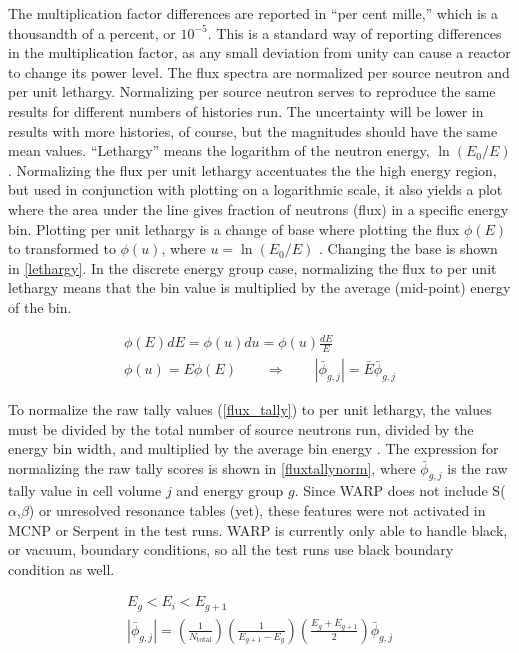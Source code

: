 The multiplication factor differences are reported in ``per cent mille,'' which is a thousandth of a percent, or $10^{-5}$.  This is a standard way of reporting differences in the multiplication factor, as any small deviation from unity can cause a reactor to change its power level.  The flux spectra are normalized per source neutron and per unit lethargy.  Normalizing per source neutron serves to reproduce the same results for different numbers of histories run.  The uncertainty will be lower in results with more histories, of course, but the magnitudes should have the same mean values.   ``Lethargy'' means the logarithm of the neutron energy, $\ln(E_0/E)$ \cite{duderstadt}.  Normalizing the flux per unit lethargy accentuates the the high energy region, but used in conjunction with plotting on a logarithmic scale, it also yields a plot where the area under the line gives fraction of neutrons (flux) in a specific energy bin.  Plotting per unit lethargy is a change of base where plotting the flux $\phi(E)$ to transformed to $\phi(u)$, where $u=\ln(E_0/E)$ \cite{lethargyplot}.  Changing the base is shown in \eqref{lethargy}.  In the discrete energy group case, normalizing the flux to per unit lethargy means that the bin value is multiplied by the average (mid-point) energy of the bin.

\begin{equation}
\label{lethargy}
\begin{gathered}
\phi(E) dE = \phi(u) du = \phi(u) \frac{dE}{E}\\
\phi(u) = E \phi(E) \qquad \Rightarrow \qquad  |\bar{\phi}_{g,j}| = \bar{E} \bar{\phi}_{g,j}
\end{gathered}
\end{equation}

To normalize the raw tally values (\eqref{flux_tally}) to per unit lethargy, the values must be divided by the total number of source neutrons run, divided by the energy bin width, and multiplied by the average bin energy \cite{lethargyplot}.  The expression for normalizing the raw tally scores is shown in \eqref{fluxtallynorm}, where $\bar{\phi}_{g,j}$ is the raw tally value in cell volume $j$ and energy group $g$.  Since WARP does not include S($\alpha$,$\beta$) or unresolved resonance tables (yet), these features were not activated in MCNP or Serpent in the test runs.  WARP is currently only able to handle black, or vacuum, boundary conditions, so all the test runs use black boundary condition as well.

\begin{equation}
\label{fluxtallynorm}
\begin{gathered}
E_g < E_i < E_{g+1} \\
|\bar{\phi}_{g,j}| = \left( \frac{1}{N_\mathrm{total}}\right) \left(\frac{1}{E_{g+1}-E_g}\right) \left(\frac{E_g+E_{g+1}}{2} \right) \bar{\phi}_{g,j}
\end{gathered}
\end{equation}

